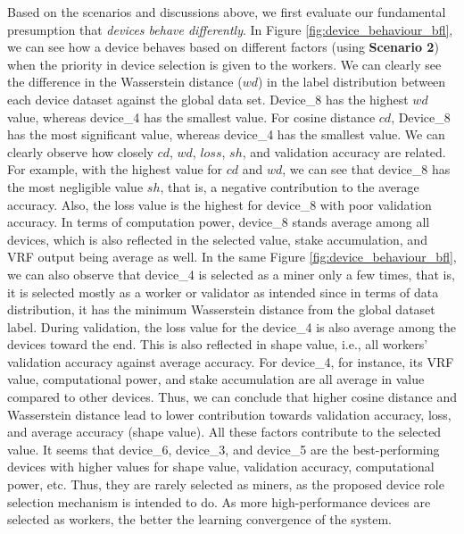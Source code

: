 Based on the scenarios and discussions above, we first evaluate our fundamental presumption that \textit{devices
behave differently}.
In Figure \ref{fig:device_behaviour_bfl}, 
we can see how
a device behaves based on different factors 
(using \textbf{Scenario 2}) when the priority in device selection is given to the workers.
We can clearly see the difference in the Wasserstein distance ($wd$) in the
label distribution between each device dataset
against the global data set.
Device\_8 has the highest $wd$ value, whereas device\_4 has the smallest value.
For cosine distance $cd$, Device\_8 has the most significant value, whereas device\_4 has the smallest value.
We can clearly observe how closely $cd$, $wd$, $loss$, $sh$, and validation accuracy are related.
For example, with the highest value for $cd$ and $wd$, we can see that device\_8 has the most negligible value $sh$, that is, a negative contribution to the average accuracy.
Also, the loss value is the highest for device\_8 with poor validation accuracy.
In terms of computation power, device\_8 stands average among all devices, which is also reflected in the selected value, stake accumulation, and VRF output being average as well.
In the same Figure \ref{fig:device_behaviour_bfl}, we can also observe that  device\_4 is selected as a miner
only a few times, that is, it is selected mostly as a worker or validator as intended since in terms of data distribution, 
it has the minimum Wasserstein distance from the global
dataset label.
During validation, the loss value for the device\_4 is also average among the devices toward the end. 
This is also reflected in shape value, i.e., all workers' validation accuracy against average
accuracy.
For device\_4, for instance, its VRF value, computational power, and stake accumulation are all
average in value compared to other devices. 
Thus, we can conclude that higher cosine distance and Wasserstein distance lead to lower contribution towards validation accuracy, loss, and average accuracy (shape value).
All these factors contribute to the selected value.
It seems that device\_6, device\_3, and device\_5 are the best-performing devices
with higher values for shape value, validation accuracy, computational power, etc.
Thus, they are rarely selected as miners, as the proposed device role selection
mechanism is intended to do.
As more high-performance devices are selected as workers, the better the learning convergence
of the system.

